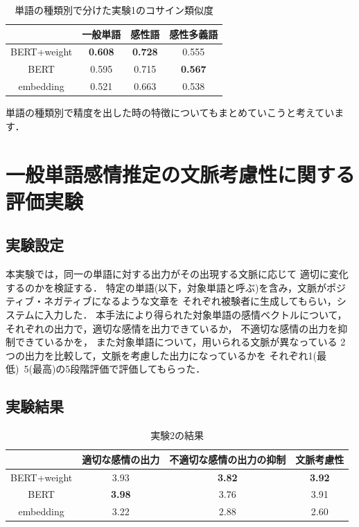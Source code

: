		\begin{table}[H]
			\centering
			\caption{単語の種類別で分けた実験1のコサイン類似度}
			\label{table:cos_sim_hinshi}
				\begin{tabular}{cccc}
					\hline
					& 一般単語 & 感性語 & 感性多義語 \\
					\hline \hline
					BERT+weight & \textbf{0.608} & \textbf{0.728} & 0.555 \\
					BERT & 0.595 & 0.715 & \textbf{0.567} \\
					embedding & 0.521 & 0.663 & 0.538 \\
					\hline
				\end{tabular}
		\end{table}


		単語の種類別で精度を出した時の特徴についてもまとめていこうと考えています．

					

\section{一般単語感情推定の文脈考慮性に関する評価実験}
	\subsection{実験設定}
		本実験では，同一の単語に対する出力がその出現する文脈に応じて
		適切に変化するのかを検証する．
		特定の単語(以下，対象単語と呼ぶ)を含み，文脈がポジティブ・ネガティブになるような文章を
		それぞれ被験者に生成してもらい，システムに入力した．
		本手法により得られた対象単語の感情ベクトルについて，
		それぞれの出力で，適切な感情を出力できているか，
		不適切な感情の出力を抑制できているかを，
		また対象単語について，用いられる文脈が異なっている
		2つの出力を比較して，文脈を考慮した出力になっているかを
		それぞれ1(最低)~5(最高)の5段階評価で評価してもらった．


	\subsection{実験結果}
	\begin{table}[H]
		\centering
		\caption{実験2の結果}
		\label{normal_word_result}
			\begin{tabular}{cccc}
				\hline
				& 適切な感情の出力 & 不適切な感情の出力の抑制 & 文脈考慮性 \\
				\hline \hline
				BERT+weight & 3.93 & \textbf{3.82} & \textbf{3.92} \\
				BERT & \textbf{3.98} & 3.76 & 3.91 \\
				embedding & 3.22 & 2.88 & 2.60 \\
				\hline
			\end{tabular}
		\end{table}
